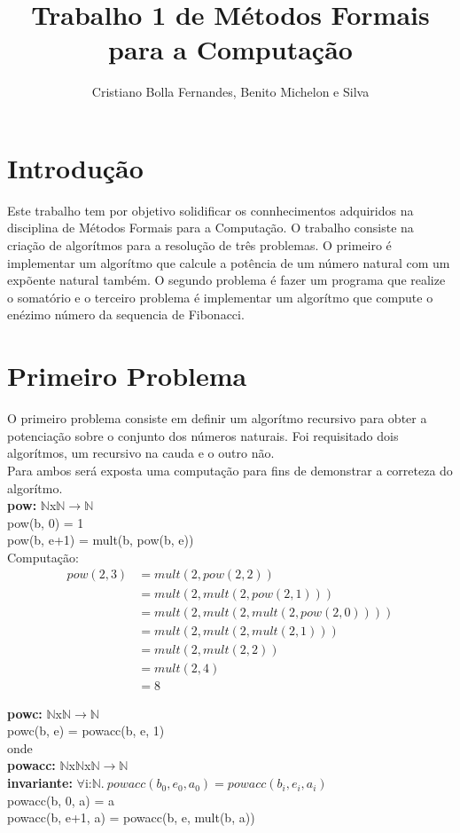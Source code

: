 \documentclass{article}
\title{Trabalho 1 de Métodos Formais para a Computação}
\author{Cristiano Bolla Fernandes, Benito Michelon e Silva}
\begin{document}
\maketitle

\section{Introdução}
Este trabalho tem por objetivo solidificar os connhecimentos adquiridos na disciplina de Métodos Formais para a Computação.
O trabalho consiste na criação de algorítmos para a resolução de três problemas. O primeiro é implementar um algorítmo que calcule a
potência de um número natural com um expõente natural também. O segundo problema é fazer um programa que realize o somatório e o
terceiro problema é implementar um algorítmo que compute o enézimo número da sequencia de Fibonacci.

\section{Primeiro Problema}
O primeiro problema consiste em definir um algorítmo recursivo para obter a potenciação sobre o conjunto dos números naturais.
Foi requisitado dois algorítmos, um recursivo na cauda e o outro não.\\
Para ambos será exposta uma computação para fins de demonstrar a correteza do algorítmo.\\
\textbf{pow:} $\mathbb{N}$x$\mathbb{N}$$ \rightarrow \mathbb{N}$\\
pow(b, 0) = 1\\
pow(b, e+1) = mult(b, pow(b, e))\\

Computação:\\
\begin{align*}
pow(2,3) &= mult(2, pow(2, 2))\\
&= mult(2, mult(2, pow(2, 1)))\\
&= mult(2, mult(2, mult(2, pow(2, 0))))\\
&= mult(2, mult(2, mult(2, 1)))\\
&= mult(2, mult(2, 2))\\
&= mult(2, 4)\\
&= 8
\end{align*}

\noindent \textbf{powc:} $\mathbb{N}$x$\mathbb{N}$$ \rightarrow \mathbb{N}$\\
powc(b, e) = powacc(b, e, 1)\\
onde\\
\indent \textbf{powacc:} $\mathbb{N}$x$\mathbb{N}$x$\mathbb{N}$$ \rightarrow \mathbb{N}$\\
\indent \textbf{invariante:} $\forall$i:$\mathbb{N}.\: powacc(b_0,e_0, a_0) = powacc(b_i, e_i, a_i)$\\
\indent powacc(b, 0, a) = a\\
\indent powacc(b, e+1, a) = powacc(b, e, mult(b, a))\\
\end{document}
